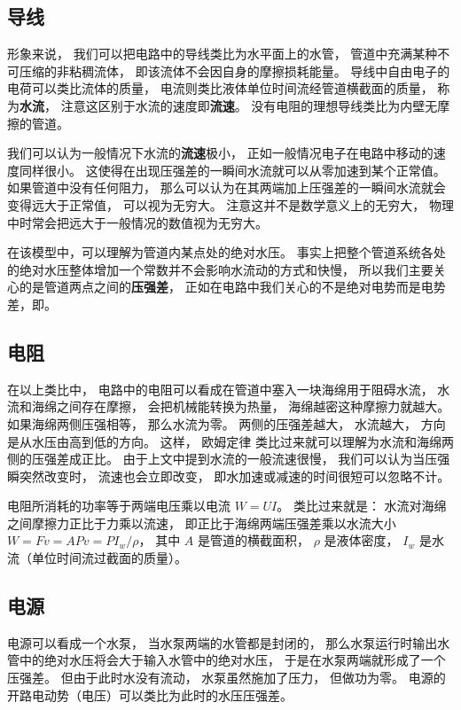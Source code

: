 
\subsection{导线}
形象来说， 我们可以把电路中的导线类比为水平面上的水管， 管道中充满某种不可压缩的非粘稠流体， 即该流体不会因自身的摩擦损耗能量。 导线中自由电子的电荷可以类比流体的质量， 电流则类比液体单位时间流经管道横截面的质量， 称为\textbf{水流}， 注意这区别于水流的速度即\textbf{流速}。 没有电阻的理想导线类比为内壁无摩擦的管道。

我们可以认为一般情况下水流的\textbf{流速}极小， 正如一般情况电子在电路中移动的速度同样很小。 这使得在出现压强差的一瞬间水流就可以从零加速到某个正常值。 如果管道中没有任何阻力， 那么可以认为在其两端加上压强差的一瞬间水流就会变得远大于正常值， 可以视为无穷大。 注意这并不是数学意义上的无穷大， 物理中时常会把远大于一般情况的数值视为无穷大。

在该模型中，可以理解为管道内某点处的绝对水压。 事实上把整个管道系统各处的绝对水压整体增加一个常数并不会影响水流动的方式和快慢， 所以我们主要关心的是管道两点之间的\textbf{压强差}， 正如在电路中我们关心的不是绝对电势而是电势差，即。

\subsection{电阻}
在以上类比中， 电路中的电阻可以看成在管道中塞入一块海绵用于阻碍水流， 水流和海绵之间存在摩擦， 会把机械能转换为热量， 海绵越密这种摩擦力就越大。 如果海绵两侧压强相等， 那么水流为零。 两侧的压强差越大， 水流越大， 方向是从水压由高到低的方向。 这样， 欧姆定律 类比过来就可以理解为水流和海绵两侧的压强差成正比。 由于上文中提到水流的一般流速很慢， 我们可以认为当压强瞬突然改变时， 流速也会立即改变， 即水加速或减速的时间很短可以忽略不计。

电阻所消耗的功率等于两端电压乘以电流 $W = UI$。 类比过来就是： 水流对海绵之间摩擦力正比于力乘以流速， 即正比于海绵两端压强差乘以水流大小 $W = F v = APv = PI_w/\rho$， 其中 $A$ 是管道的横截面积， $\rho$ 是液体密度， $I_w$ 是水流（单位时间流过截面的质量）。

\subsection{电源}
电源可以看成一个水泵， 当水泵两端的水管都是封闭的， 那么水泵运行时输出水管中的绝对水压将会大于输入水管中的绝对水压， 于是在水泵两端就形成了一个压强差。 但由于此时水没有流动， 水泵虽然施加了压力， 但做功为零。 电源的开路电动势（电压）可以类比为此时的水压压强差。

